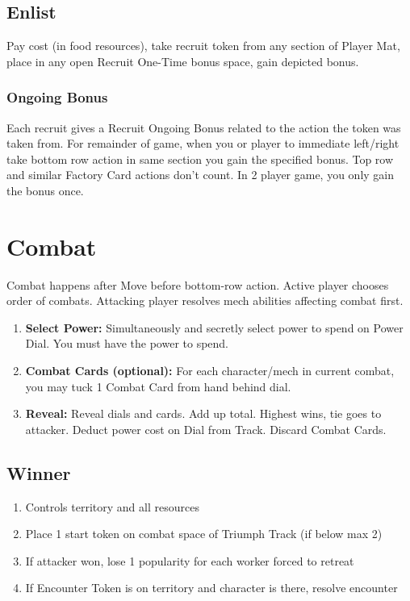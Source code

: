 \documentclass[12pt]{article}
\newenvironment{enumerateCustom}
{\begin{enumerate}
  \setlength{\itemsep}{1pt}
  \setlength{\parskip}{0pt}
  \setlength{\parsep}{0pt}}
{\end{enumerate}}
\begin{document}
\begin{multicols*}{2}
\subsection*{Enlist}
Pay cost (in food resources), take recruit token from any section of Player Mat, place in any open Recruit One-Time bonus space, gain depicted bonus.

\subsubsection*{Ongoing Bonus}
Each recruit gives a Recruit Ongoing Bonus related to the action the token was taken from. For remainder of game, when you or player to immediate left/right take bottom row action in same section you gain the specified bonus. Top row and similar Factory Card actions don't count. In 2 player game, you only gain the bonus once.

\section*{Combat}
Combat happens after Move before bottom-row action. Active player chooses order of combats. Attacking player resolves mech abilities affecting combat first.

\begin{enumerateCustom}
    \item \textbf{Select Power:} Simultaneously and secretly select power to spend on Power Dial. You must have the power to spend.
    \item \textbf{Combat Cards (optional):} For each character/mech in current combat, you may tuck 1 Combat Card from hand behind dial.
    \item \textbf{Reveal:} Reveal dials and cards. Add up total. Highest wins, tie goes to attacker. Deduct power cost on Dial from Track. Discard Combat Cards.
\end{enumerateCustom}

\subsection*{Winner}
\begin{enumerateCustom}
    \item Controls territory and all resources
    \item Place 1 start token on combat space of Triumph Track (if below max 2)
    \item If attacker won, lose 1 popularity for each worker forced to retreat
    \item If Encounter Token is on territory and character is there, resolve encounter
\end{enumerateCustom}


\end{multicols*}
\end{document}
